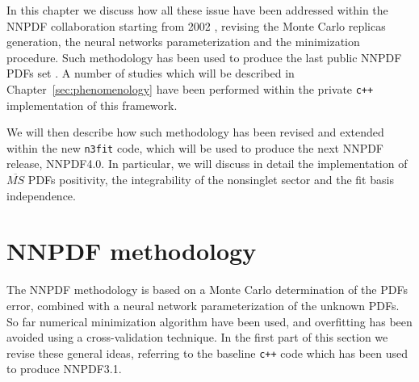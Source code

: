 %
In this chapter we discuss how all these issue have been addressed within the NNPDF collaboration
starting from 2002 \cite{Forte:2002fg}, revising the Monte Carlo replicas generation, the neural networks parameterization
and the minimization procedure. Such methodology has been used to produce the last public NNPDF PDFs set \cite{Ball:2017nwa}
. A number of studies which will be described in Chapter~\ref{sec:phenomenology} have been performed within the private
{\tt c++ } implementation of this framework.

%
We will then describe how such methodology has been revised and extended 
within the new {\tt n3fit} code, which will be used to produce the next NNPDF release, NNPDF4.0.
In particular, we will discuss in detail the implementation of $\overline{MS}$ PDFs positivity,
the integrability of the nonsinglet sector and the fit basis independence.

\section{NNPDF methodology}

The NNPDF methodology is based on a Monte Carlo determination of the PDFs error, combined
with a neural network parameterization of the unknown PDFs. So far numerical minimization algorithm
have been used, and overfitting has been avoided using a cross-validation technique.
In the first part of this section we revise these general ideas, referring to the baseline {\tt c++} code which
has been used to produce NNPDF3.1. 


